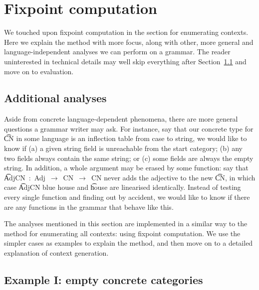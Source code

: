 \section{Fixpoint computation}
\label{sec:moreFP}

We touched upon fixpoint computation in the section for enumerating
contexts. Here we explain the method with more focus, along with
other, more general and language-independent analyses we can perform
on a grammar. The reader uninterested in technical details may well
skip everything after Section~\ref{additional-analyses} and move on to
evaluation.

\subsection{Additional analyses}
\label{additional-analyses}

Aside from concrete language-dependent phenomena, there are more
general questions a grammar writer may ask. For instance, say that our
concrete type for \t{CN} in some language is an inflection table from
case to string, we would like to know if (a) a given string field is
unreachable from the start category; (b) any two fields always contain
the same string; or (c) some fields are always the empty string.  In
addition, a whole argument may be erased by some function: say that
\t{AdjCN~:~Adj~$\rightarrow$~CN~$\rightarrow$~CN} never adds the
adjective to the new \t{CN}, in which case \t{AdjCN blue house} and
\t{house} are linearised identically. Instead of testing every single
function and finding out by accident, we would like to know if there
are any functions in the grammar that behave like this.


The analyses mentioned in this section are implemented in a similar
way to the method for enumerating all contexts: using fixpoint
computation. We use the simpler cases as examples to explain the
method, and then move on to a detailed explanation of context
generation.

\subsection{Example I: empty concrete categories}

